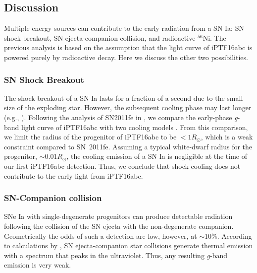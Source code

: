 \documentclass[twocolumn]{aastex61}
\newcommand{\sr}{R_\odot}
\begin{document}
\subsection{Discussion}
\label{sec:lc_energy}

Multiple energy sources can contribute to the early radiation from a SN Ia: SN shock
breakout, SN ejecta-companion collision, and radioactive 
$^{56}$Ni. The previous analysis is based on the assumption that the light curve of
iPTF16abc is powered purely by radioactive decay. Here we discuss the
other two possibilities.

\subsubsection{SN Shock Breakout}

The shock breakout of a SN Ia lasts for a fraction of a second due to
the small size of the exploding star. However, the subsequent cooling
phase may last longer (e.g., \citealt{2010ApJ...708..598P}).
Following the analysis of SN2011fe in \citet{2012ApJ...744L..17B}, we
compare the early-phase \textit{g}-band light curve of iPTF16abc with
two cooling models \citep{2011ApJ...728...63R, 2010ApJ...708..598P}. From this comparison, we limit the radius of 
the
progenitor of iPTF16abc to be $<1\sr$, which is a weak constraint compared to SN~2011fe. Assuming a 
typical white-dwarf radius for the progenitor, $\sim{0.01}\sr$, the cooling emission of a
SN Ia is negligible at the time of our first iPTF16abc detection. 
Thus, we conclude that shock cooling does not contribute to the 
early light from iPTF16abc.

\subsubsection{SN-Companion collision}

SNe Ia with single-degenerate progenitors can produce detectable 
radiation following the collision of the SN ejecta with the 
non-degenerate companion. Geometrically the odds of such a 
detection are low, however, at $\sim$10\%. According to 
calculations by
\citet{2010ApJ...708.1025K}, SN ejecta-companion star collisions 
generate thermal emission with a spectrum that peaks in the 
ultraviolet. Thus, any resulting \textit{g}-band emission is very weak.
\end{document}
